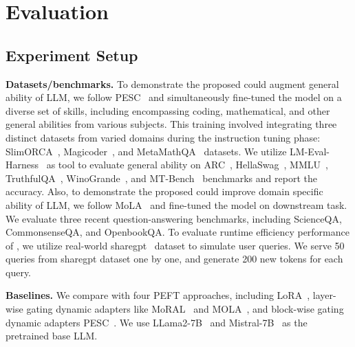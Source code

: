 \section{Evaluation}

\renewcommand{\topfraction}{0.9}
\renewcommand{\bottomfraction}{0.8}
\setcounter{topnumber}{2}
\setcounter{bottomnumber}{2}
\setcounter{totalnumber}{4}
\renewcommand{\dbltopfraction}{0.9}
\setcounter{dbltopnumber}{2}


\subsection{Experiment Setup}

\noindent\textbf{Datasets/benchmarks.}
To demonstrate the proposed \sys could augment general ability of LLM, we follow PESC~\cite{wu2024parameter} and simultaneously fine-tuned the model on a diverse set of skills, including encompassing coding, mathematical, and other general abilities from various subjects. This training involved integrating three distinct datasets from varied domains during the instruction tuning phase: SlimORCA~\cite{SlimOrca},  Magicoder~\cite{wei2023magicoder}, and MetaMathQA~\cite{yu2023metamath} datasets.
We utilize LM-Eval-Harness~\cite{eval-harness} as tool to evaluate general ability on ARC~\cite{Clark2018ThinkYH}, HellaSwag~\cite{zellers2019hellaswag}, MMLU~\cite{hendryckstest2021}, TruthfulQA~\cite{lin-etal-2022-truthfulqa}, WinoGrande~\cite{sakaguchi2019winogrande}, and MT-Bench~\cite{zheng2023judging} benchmarks and report the accuracy.
% 
Also, to demonstrate the proposed \sys could improve domain specific ability of LLM, we follow MoLA~\cite{gao2024higher} and fine-tuned the model on downstream task. We evaluate three recent question-answering benchmarks, including ScienceQA\cite{lu2022learn}, CommonsenseQA\cite{talmor-etal-2019-commonsenseqa}, and OpenbookQA\cite{OpenBookQA2018}.
% 
To evaluate runtime efficiency performance of \sys, we utilize real-world sharegpt~\cite{openchat2023sharegpt4} dataset to simulate user queries. We serve 50 queries from sharegpt dataset one by one, and generate 200 new tokens for each query.

\noindent\textbf{Baselines.}
We compare \sys with four PEFT approaches, including LoRA~\cite{Hu2021LoRALA}, layer-wise gating dynamic adapters like MoRAL~\cite{yang2024moral} and MOLA~\cite{gao2024higher}, and block-wise gating dynamic adapters PESC~\cite{wu2024parameter}. We use LLama2-7B~\cite{Touvron2023Llama2O} and Mistral-7B~\cite{jiang2023mistral} as the pretrained base LLM.

